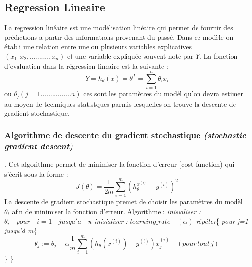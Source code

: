 \documentclass[a4paper,11pt]{report}
\begin{document}
\subsection*{Regression Lineaire}
La regression linéaire est une modélisation linéaire qui permet de fournir des prédictions a partir des informations provenant du passé, 
Dans ce modèle on établi une relation entre une ou plusieurs variables explicatives $(x_1,x_2,..........,x_n)$ et une variable expliquée souvent noté par $Y$.\newline
La fonction d'evaluation dans la régression lineaire est la suivante : \newline
$$Y =h_{\theta}(x) = \theta^T = \sum_{i=1}^{n} \theta_ix_i $$\newline
ou $\theta_j (j=1................n)$ ces sont les paramètres du modèl qu'on devra estimer au moyen de techniques statistques parmis  lesquelles on trouve la descente de gradient stochastique.\newline
\subsubsection{Algorithme de descente du gradient stochastique \textit{(stochastic gradient descent)}}.\newline
Cet algorithme permet de minimiser la fonction d'erreur (cost function) qui s'écrit sous la forme : \newline
$$J(\theta) = \dfrac{1}{2m}\sum_{i=1}^{m} (h_{\theta}^{x^{(i)}} - y^{(i)})^2$$\newline  
\newline
La descente de gradient stochastique premet de choisir les paramètres du modèl $\theta_i$ afin de minimiser la fonction d'erreur.\newline
Algorithme : \newline
\textit{inisialiser :} $\theta_i\quad pour\quad i=1 \quad jusqu'a\quad n$\newline
\textit{inisialiser : }$learning\_rate\quad(\alpha)$\newline
\textit{répéter}\{\newline 
\hspace*{1cm}\textit{pour j=1 jusqu'à m}\{
$$\theta_j := \theta_j - \alpha  \dfrac{1}{m}\sum_{i = 1}^{m} (h_\theta(x^{(i)}) - y^{(i)})x_j^{(i)} \quad(pour\, tout \, j)$$
\hspace*{1cm}\}\newline
\} 
\end{document}
